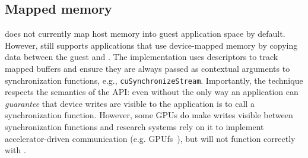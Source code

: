 \subsection{Mapped memory}

\AvA does not currently map \worker host memory into guest application space
by default. However, \AvA still supports applications that use device-mapped
memory by copying data between the guest and \worker. The implementation uses
\Lapis descriptors to track mapped buffers and ensure they are always passed
as contextual arguments to synchronization functions, e.g.,
\texttt{cuSynchronizeStream}. Importantly, the technique respects the
semantics of the API: even without \AvA the only way an application can
\emph{guarantee} that device writes are visible to the application is to call
a synchronization function. However, some GPUs do make writes visible between
synchronization functions and research systems rely on it to implement
accelerator-driven communication (e.g. GPUfs~\cite{silberstein2013gpufs}), but will not
function correctly with \AvA.